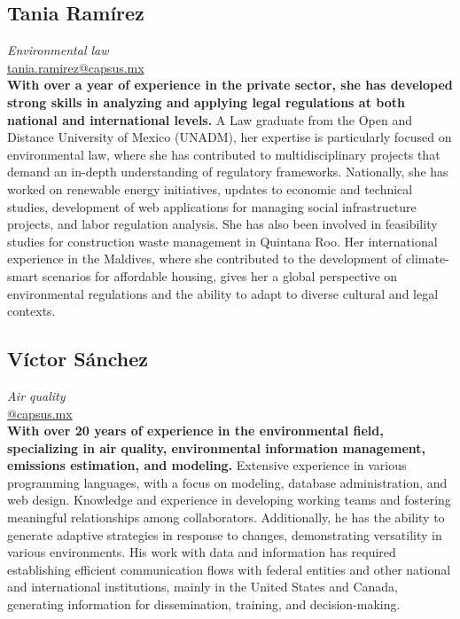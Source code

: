 \documentclass[
	a4paper,
	12pt,
	unnumberedsections,
]{CSSullivanBusinessReport}
\begin{document}
\subsection*{Tania Ramírez}
\textit{Environmental law} \\
\href{mailto:tania.ramirez@capsus.mx}{tania.ramirez@capsus.mx} \\[0.5em]
\textbf{With over a year of experience in the private sector, she has developed strong skills in analyzing and applying legal regulations at both national and international levels.} A Law graduate from the Open and Distance University of Mexico (UNADM), her expertise is particularly focused on environmental law, where she has contributed to multidisciplinary projects that demand an in-depth understanding of regulatory frameworks. Nationally, she has worked on renewable energy initiatives, updates to economic and technical studies, development of web applications for managing social infrastructure projects, and labor regulation analysis. She has also been involved in feasibility studies for construction waste management in Quintana Roo. Her international experience in the Maldives, where she contributed to the development of climate-smart scenarios for affordable housing, gives her a global perspective on environmental regulations and the ability to adapt to diverse cultural and legal contexts.

\subsection*{Víctor Sánchez}
\textit{Air quality} \\
\href{mailto:@capsus.mx}{@capsus.mx} \\[0.5em]
\textbf{With over 20 years of experience in the environmental field, specializing in air quality, environmental information management, emissions estimation, and modeling.} Extensive experience in various programming languages, with a focus on modeling, database administration, and web design. Knowledge and experience in developing working teams and fostering meaningful relationships among collaborators. Additionally, he has the ability to generate adaptive strategies in response to changes, demonstrating versatility in various environments. His work with data and information has required establishing efficient communication flows with federal entities and other national and international institutions, mainly in the United States and Canada, generating information for dissemination, training, and decision-making.
\end{document}
